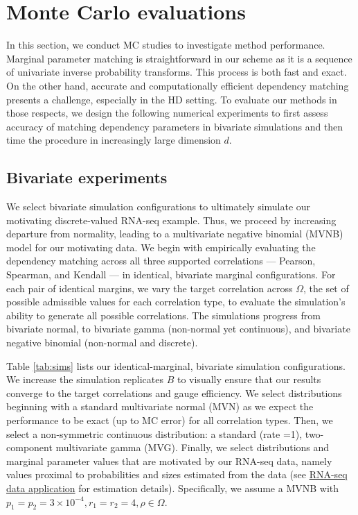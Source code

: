 \documentclass{article}
\begin{document}
\hypertarget{simulations}{%
\section{Monte Carlo evaluations}\label{simulations}}

In this section, we conduct MC studies to investigate method
performance. Marginal parameter matching is straightforward in our
scheme as it is a sequence of univariate inverse probability transforms.
This process is both fast and exact. On the other hand, accurate and
computationally efficient dependency matching presents a challenge,
especially in the HD setting. To evaluate our methods in those respects,
we design the following numerical experiments to first assess accuracy
of matching dependency parameters in bivariate simulations and then time
the procedure in increasingly large dimension \(d\).

\hypertarget{bivariate-experiments}{%
\subsection{Bivariate experiments}\label{bivariate-experiments}}

We select bivariate simulation configurations to ultimately simulate our
motivating discrete-valued RNA-seq example. Thus, we proceed by
increasing departure from normality, leading to a multivariate negative
binomial (MVNB) model for our motivating data. We begin with empirically
evaluating the dependency matching across all three supported
correlations --- Pearson, Spearman, and Kendall --- in identical,
bivariate marginal configurations. For each pair of identical margins,
we vary the target correlation across \(\Omega\), the set of possible
admissible values for each correlation type, to evaluate the
simulation's ability to generate all possible correlations. The
simulations progress from bivariate normal, to bivariate gamma
(non-normal yet continuous), and bivariate negative binomial (non-normal
and discrete).

Table \ref{tab:sims} lists our identical-marginal, bivariate simulation
configurations. We increase the simulation replicates \(B\) to visually
ensure that our results converge to the target correlations and gauge
efficiency. We select distributions beginning with a standard
multivariate normal (MVN) as we expect the performance to be exact (up
to MC error) for all correlation types. Then, we select a non-symmetric
continuous distribution: a standard (rate =1), two-component
multivariate gamma (MVG). Finally, we select distributions and marginal
parameter values that are motivated by our RNA-seq data, namely values
proximal to probabilities and sizes estimated from the data (see
\href{examples}{RNA-seq data application} for estimation details).
Specifically, we assume a MVNB with
\(p_1 = p_2 = 3\times10^{-4}, r_1 = r_2 = 4, \rho \in \Omega\).
\end{document}

